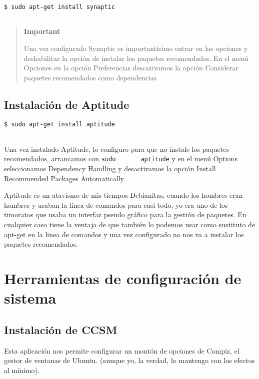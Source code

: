 \begin{verbatim}
$ sudo apt-get install synaptic
      
\end{verbatim}

\begin{quote}
\textbf{Important}

Una vez configurado Synaptic es importantísimo entrar en las opciones y
deshabilitar la opción de instalar los paquetes recomendados. En el menú
Opciones en la opción Preferencias descativamos la opción Considerar
paquetes recomendados como dependencias
\end{quote}

\subsection{Instalación de Aptitude}\label{instalaciuxf3n-de-aptitude}

\begin{verbatim}
$ sudo apt-get install aptitude
      
\end{verbatim}

Una vez instalado Aptitude, lo configuro para que no instale los
paquetes recomendados, arrancamos con
\texttt{sudo\ \ \ \ \ \ \ aptitude} y en el menú Options seleccionamos
Dependency Handling y desactivamos la opción Install Recommended
Packages Automatically

Aptitude es un atavismo de mis tiempos Debianitas, cuando los hombres
eran hombres y usaban la linea de comandos para casi todo, yo era uno de
los timoratos que usaba un interfaz pseudo gráfico para la gestión de
paquetes. En cualquier caso tiene la ventaja de que también lo podemos
usar como sustituto de apt-get en la linea de comandos y una vez
configurado no nos va a instalar los paquetes recomendados.

\section{Herramientas de configuración de
sistema}\label{herramientas-de-configuraciuxf3n-de-sistema}

\subsection{Instalación de CCSM}\label{instalaciuxf3n-de-ccsm}

Esta aplicación nos permite configurar un montón de opciones de Compiz,
el gestor de ventanas de Ubuntu. (aunque yo, la verdad, lo mantengo con
los efectos al mínimo).

